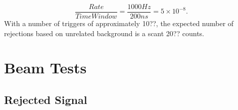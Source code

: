 \begin{equation}
\frac{Rate}{Time Window} = \frac{1000 Hz}{200 ns} = 5\times10^{-8}.
\end{equation}
With a number of triggers of approximately 10??, the expected number of rejections based on unrelated background is a scant 20?? counts.

\section{Beam Tests}

\subsection{Rejected Signal}

%
% 
% 
